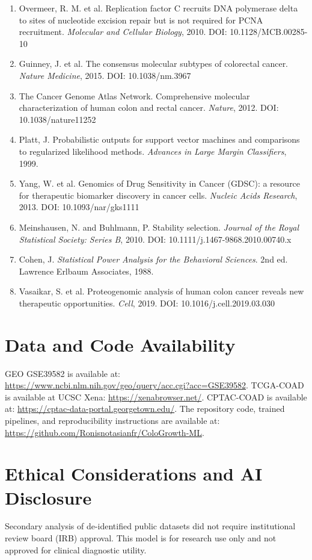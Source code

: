 \documentclass[11pt]{article}
\begin{document}
\begin{enumerate}
    \item Overmeer, R. M. et al. Replication factor C recruits DNA polymerase delta to sites of nucleotide excision repair but is not required for PCNA recruitment. \textit{Molecular and Cellular Biology}, 2010. DOI: 10.1128/MCB.00285-10
    \item Guinney, J. et al. The consensus molecular subtypes of colorectal cancer. \textit{Nature Medicine}, 2015. DOI: 10.1038/nm.3967
    \item The Cancer Genome Atlas Network. Comprehensive molecular characterization of human colon and rectal cancer. \textit{Nature}, 2012. DOI: 10.1038/nature11252
    \item Platt, J. Probabilistic outputs for support vector machines and comparisons to regularized likelihood methods. \textit{Advances in Large Margin Classifiers}, 1999.
    \item Yang, W. et al. Genomics of Drug Sensitivity in Cancer (GDSC): a resource for therapeutic biomarker discovery in cancer cells. \textit{Nucleic Acids Research}, 2013. DOI: 10.1093/nar/gks1111
    \item Meinshausen, N. and Buhlmann, P. Stability selection. \textit{Journal of the Royal Statistical Society: Series B}, 2010. DOI: 10.1111/j.1467-9868.2010.00740.x
    \item Cohen, J. \textit{Statistical Power Analysis for the Behavioral Sciences}. 2nd ed. Lawrence Erlbaum Associates, 1988.
    \item Vasaikar, S. et al. Proteogenomic analysis of human colon cancer reveals new therapeutic opportunities. \textit{Cell}, 2019. DOI: 10.1016/j.cell.2019.03.030
\end{enumerate}

\section*{Data and Code Availability}
GEO GSE39582 is available at: \url{https://www.ncbi.nlm.nih.gov/geo/query/acc.cgi?acc=GSE39582}. TCGA-COAD is available at UCSC Xena: \url{https://xenabrowser.net/}. CPTAC-COAD is available at: \url{https://cptac-data-portal.georgetown.edu/}. The repository code, trained pipelines, and reproducibility instructions are available at: \url{https://github.com/Ronisnotasianfr/ColoGrowth-ML}.

\section*{Ethical Considerations and AI Disclosure}
Secondary analysis of de-identified public datasets did not require institutional review board (IRB) approval. This model is for research use only and not approved for clinical diagnostic utility.
\end{document}
